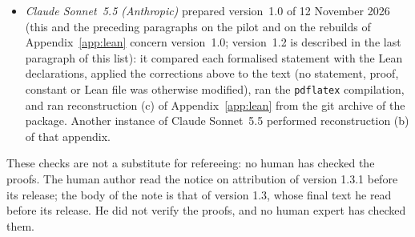 \documentclass[11pt,a4paper]{article}
\theoremstyle{plain}
\theoremstyle{definition}
\theoremstyle{remark}
\numberwithin{equation}{section}
\begin{document}
\begin{itemize}
\item \emph{Claude Sonnet~5.5 (Anthropic)} prepared version~1.0 of 12 November 2026 (this and the preceding paragraphs on the pilot and on the rebuilds of Appendix~\ref{app:lean} concern version~1.0; version~1.2 is described in the last paragraph of this list): it compared each formalised statement with the Lean
declarations, applied the corrections above to the text (no statement, proof, constant or Lean file was otherwise modified), ran the
\texttt{pdflatex} compilation, and ran reconstruction (c) of Appendix~\ref{app:lean} from the git archive of the package. Another instance of Claude Sonnet~5.5 performed
reconstruction (b) of that appendix.
\end{itemize}
These checks are not a substitute for refereeing: no human has checked the proofs.
The human author read the notice on attribution of version 1.3.1 before its release; the body of the note is that of version 1.3, whose final text he read before its release. He did not verify the proofs, and no human expert has checked them.
\end{document}
